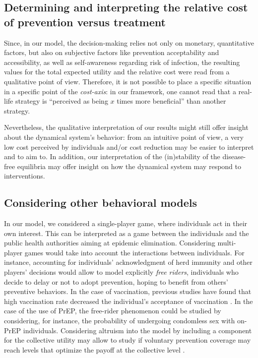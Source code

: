 
\subsection{Determining and interpreting the relative cost of prevention versus treatment}
Since, in our model, the decision-making relies not only on monetary, quantitative factors, but also on subjective factors like prevention acceptability and accessibility, as well as self-awareness regarding risk of infection, the resulting values for the total expected utility and the relative cost were read from a qualitative point of view. Therefore, it is not possible to place a specific situation in a specific point of the {\it cost-axis}: in our framework, one cannot read that a real-life strategy is ``perceived as being $x$ times more beneficial'' than another strategy. 

Nevertheless, the qualitative interpretation of our results might still offer insight about the dynamical system's behavior: from an intuitive point of view, a very low cost perceived by individuals and/or cost reduction may be easier to interpret and to aim to. In addition, our interpretation of the (in)stability of the disease-free equilibria may offer insight on how the dynamical system may respond to interventions. 


\subsection{Considering other behavioral models}
In our model, we considered a single-player game, where individuals act in their own interest. This can be interpreted as a game between the individuals and the public health authorities aiming at epidemic elimination. Considering multi-player games would take into account the interactions between individuals. For instance, accounting for individuals' acknowledgment of herd immunity and other players' decisions would allow to model explicitly \textit{free riders}, individuals who decide to delay or not to adopt prevention, hoping to benefit from others' preventive behaviors. In the case of vaccination, previous studies have found that high vaccination rate decreased the individual's acceptance of vaccination \cite[]{Ibuka2014}. In the case of the use of PrEP, the free-rider phenomenon could be studied by considering, for instance, the probability of undergoing condomless sex with on-PrEP individuals. Considering altruism into the model by including a component for the collective utility may allow to study if voluntary prevention coverage may reach levels that optimize the payoff at the collective level \cite[]{Shim2012}. 



